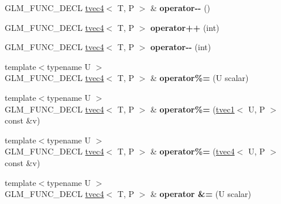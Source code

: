 \begin{DoxyCompactItemize}
G\+L\+M\+\_\+\+F\+U\+N\+C\+\_\+\+D\+E\+CL \hyperlink{structglm_1_1tvec4}{tvec4}$<$ T, P $>$ \& {\bfseries operator-\/-\/} ()
\item 
\mbox{\label{structglm_1_1tvec4_ad341796b1b7f91afcea916911db25bc6}} 
G\+L\+M\+\_\+\+F\+U\+N\+C\+\_\+\+D\+E\+CL \hyperlink{structglm_1_1tvec4}{tvec4}$<$ T, P $>$ {\bfseries operator++} (int)
\item 
\mbox{\label{structglm_1_1tvec4_a57ff0a19184c138fab896a0f1743d442}} 
G\+L\+M\+\_\+\+F\+U\+N\+C\+\_\+\+D\+E\+CL \hyperlink{structglm_1_1tvec4}{tvec4}$<$ T, P $>$ {\bfseries operator-\/-\/} (int)
\item 
\mbox{\label{structglm_1_1tvec4_a02e8a331532d44e052509273241892df}} 
{\footnotesize template$<$typename U $>$ }\\G\+L\+M\+\_\+\+F\+U\+N\+C\+\_\+\+D\+E\+CL \hyperlink{structglm_1_1tvec4}{tvec4}$<$ T, P $>$ \& {\bfseries operator\%=} (U scalar)
\item 
\mbox{\label{structglm_1_1tvec4_ac71d67fa398069e9899bf5c420b1cc72}} 
{\footnotesize template$<$typename U $>$ }\\G\+L\+M\+\_\+\+F\+U\+N\+C\+\_\+\+D\+E\+CL \hyperlink{structglm_1_1tvec4}{tvec4}$<$ T, P $>$ \& {\bfseries operator\%=} (\hyperlink{structglm_1_1tvec1}{tvec1}$<$ U, P $>$ const \&v)
\item 
\mbox{\label{structglm_1_1tvec4_ae741cd1a5b5495e3cfbefa2721f8c46f}} 
{\footnotesize template$<$typename U $>$ }\\G\+L\+M\+\_\+\+F\+U\+N\+C\+\_\+\+D\+E\+CL \hyperlink{structglm_1_1tvec4}{tvec4}$<$ T, P $>$ \& {\bfseries operator\%=} (\hyperlink{structglm_1_1tvec4}{tvec4}$<$ U, P $>$ const \&v)
\item 
\mbox{\label{structglm_1_1tvec4_a9cdbd2efbbdf4370abaa5717c4251338}} 
{\footnotesize template$<$typename U $>$ }\\G\+L\+M\+\_\+\+F\+U\+N\+C\+\_\+\+D\+E\+CL \hyperlink{structglm_1_1tvec4}{tvec4}$<$ T, P $>$ \& {\bfseries operator \&=} (U scalar)
\item 
\mbox{\label{structglm_1_1tvec4_a273d373eaae84c03ac2ca606e5bcbcd5}} 

\end{DoxyCompactItemize}
